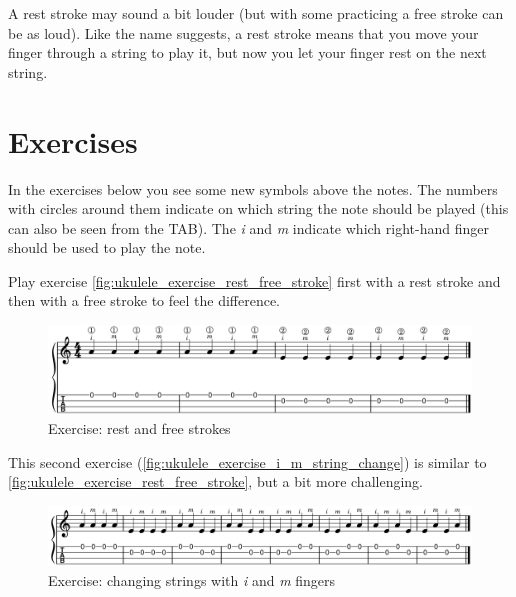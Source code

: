 A rest stroke may sound a bit louder (but with some practicing a free stroke can be as loud). Like the name suggests, a rest stroke means that you move your finger through a string to play it, but now you let your finger rest on the next string.

\section{Exercises}

In the exercises below you see some new symbols above the notes. The numbers with circles around them indicate on which string the note should be played (this can also be seen from the TAB). The \textit{i} and \textit{m} indicate which right-hand finger should be used to play the note.

Play exercise \autoref{fig:ukulele_exercise_rest_free_stroke} first with a rest stroke and then with a free stroke to feel the difference.

\begin{figure}[h]
    \centering
    \includegraphics[width=\textwidth]{../../MuseScore/Ukulele/UkuleleExerciseFreeAndRestStokeSimple.png}
    \caption{Exercise: rest and free strokes}
    \label{fig:ukulele_exercise_rest_free_stroke}
\end{figure}

This second exercise (\autoref{fig:ukulele_exercise_i_m_string_change}) is similar to \autoref{fig:ukulele_exercise_rest_free_stroke}, but a bit more challenging.

\begin{figure}[h]
    \centering
    \includegraphics[width=\textwidth]{../../MuseScore/Ukulele/UkuleleExerciseFreeAndRestStokeStepTwo.png}
    \caption{Exercise: changing strings with \textit{i} and \textit{m} fingers}
    \label{fig:ukulele_exercise_i_m_string_change}
\end{figure}

\newpage

